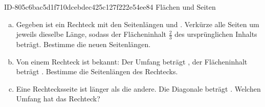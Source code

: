 \begin{exercise}
      {ID-805c6bac5d1f710dcebdec425c127f222e54ee84}
      {Flächen und Seiten}
  \ifproblem\problem
    \begin{enumerate}[a)]
      \item Gegeben ist ein Rechteck mit den Seitenlängen  und .
            Verkürze alle Seiten um jeweils dieselbe Länge, sodass der Flächeninhalt
            $\frac{2}{3}$ des ursprünglichen Inhalts beträgt. Bestimme die neuen
            Seitenlängen.
      \item Von einem Rechteck ist bekannt: Der Umfang beträgt , der
            Flächeninhalt beträgt . Bestimme die Seitenlängen des Rechtecks.
      \item Eine Rechtecksseite ist  länger als die andere. Die Diagonale
            beträgt . Welchen Umfang hat das Rechteck?
    \end{enumerate}
  \fi
\end{exercise}
